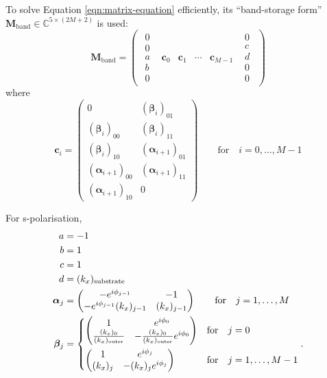 \documentclass[]{article}
\begin{document}
	To solve Equation \ref{eqn:matrix-equation} efficiently, its ``band-storage form'' $\mathbf{M}_\text{band}\in \mathbb{C}^{5\times(2M+2)}$ is used:
	\begin{equation}
		\mathbf{M}_\text{band}=
		\begin{pmatrix}
			\begin{matrix}0\\0\\a\\b\\0\end{matrix}&\bm{c}_0&\bm{c}_1&\cdots&\bm{c}_{M-1}&\begin{matrix}0\\c\\d\\0\\0\end{matrix}
		\end{pmatrix}
	\end{equation}
	where
	\begin{equation}
		\bm{c}_i=
		\begin{pmatrix}
			0&(\bm{\beta}_i)_{01}\\
			(\bm{\beta}_i)_{00}&(\bm{\beta}_i)_{11}\\
			(\bm{\beta}_i)_{10}&(\bm{\alpha}_{i+1})_{01}\\
			(\bm{\alpha}_{i+1})_{00}&(\bm{\alpha}_{i+1})_{11}\\
			(\bm{\alpha}_{i+1})_{10}&0
		\end{pmatrix}\quad\quad\text{for}\quad i=0,\dots,M-1
	\end{equation}

	For s-polarisation,
	\begin{align}
		a&=-1\\
		b&=1\\
		c&=1\\
		d&=(k_x)_\text{substrate}\\
		\bm{\alpha}_j&=
		\begin{pmatrix}
			-e^{i\phi_{j-1}}&-1\\
			-e^{i\phi_{j-1}}(k_x)_{j-1}&(k_x)_{j-1}
		\end{pmatrix}\quad\quad\text{for}\quad j=1,\dots,M\\
		\bm{\beta}_j&=
		\begin{dcases}
			\begin{pmatrix}
				1&e^{i\phi_0}\\
				\frac{(k_x)_0}{(k_x)_\text{outer}}&-\frac{(k_x)_0}{(k_x)_\text{outer}}e^{i\phi_0}
			\end{pmatrix}&\text{for}\quad j=0\\
			\begin{pmatrix}
				1&e^{i\phi_j}\\
				(k_x)_j&-(k_x)_je^{i\phi_j}
			\end{pmatrix}&\text{for}\quad j=1,\dots,M-1
		\end{dcases}.
	\end{align}
\end{document}
